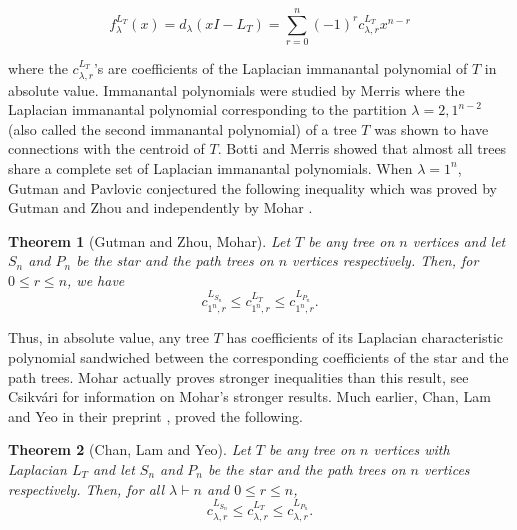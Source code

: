 \documentclass[12pt]{article}
\newtheorem{theorem}{Theorem}
\begin{document}
\begin{equation}
\label{eqn:lapl_immanant_poly}
f^{L_T}_{\lambda}(x)= d_{\lambda}(xI - L_T) =  
\sum_{r=0}^{n} (-1)^r c_{\lambda,r}^{L_T} x^{n-r} 
\end{equation}

where the $c_{\lambda,r}^{L_T}$'s are coefficients of the Laplacian 
immanantal polynomial of $T$  in absolute value.  Immanantal 
polynomials were studied by Merris 
\cite{merris-second-imm-polynom} where the Laplacian immanantal polynomial
corresponding to the partition $\lambda = 2,1^{n-2}$ (also 
called the second immanantal polynomial) of a 
tree $T$  was shown to have connections with the centroid of $T$.
Botti and Merris \cite{botti-merris-almost_all_trees} showed
that almost all trees share a complete set of Laplacian immanantal polynomials.
When $\lambda=1^n$, Gutman and Pavlovic 
\cite{gutman-pavlovic_Laplacian_coeff} conjectured the following 
inequality  
which was proved by Gutman and Zhou 
\cite{gutman-zhao-connection-Laplacian-spectra}
and independently by Mohar \cite{mohar-Laplacian-coeffs-acyclic-graphs}.


\begin{theorem}[Gutman and Zhou, Mohar]
\label{thm:Gutman_pavlovic_conjecture}
Let $T$ be any  tree on $n$ vertices and let $S_n$ and $P_n$ be the star and the path
trees on $n$ vertices respectively.  Then, for $0 \leq r \leq n$, we have
\begin{equation*}
  c_{1^n,r}^{L_{S_n}} \leq c_{1^n,r}^{L_T} \leq c_{1^n,r}^{L_{P_n}}.
\end{equation*}
\end{theorem}

Thus, in absolute value, any tree $T$ has coefficients of its Laplacian characteristic 
polynomial sandwiched between the corresponding coefficients of the star and the path 
trees.  
Mohar actually proves stronger inequalities than this result, see 
Csikv{\'a}ri  \cite[Section 10]{csikvari-poset2} for information on Mohar's
stronger results.  Much earlier, Chan, Lam and Yeo in their preprint 
\cite{chan_lam_yeo}, proved the following.

\begin{theorem}[Chan, Lam and Yeo]
  \label{thm:chan_lam_yeo}
Let $T$ be any  tree on $n$ vertices with Laplacian $L_T$ and let $S_n$ and $P_n$ 
be the star and the path
trees on $n$ vertices respectively.  Then, 
for all $\lambda \vdash n$ and $0\leq r \leq n$, 
\begin{equation}
  \label{eqn:chan_lam_yeo}
  c_{\lambda,r}^{L_{S_n}} \leq c_{\lambda,r}^{L_T} \leq c_{\lambda,r}^{L_{P_n}}.
\end{equation}
\end{theorem}
\end{document}

